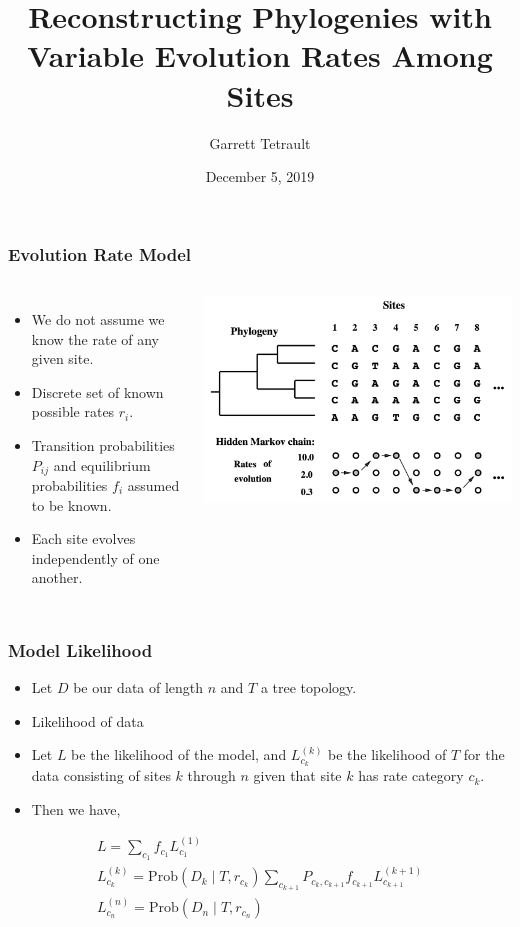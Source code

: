 \documentclass{beamer}
\title{Reconstructing Phylogenies with Variable Evolution Rates Among Sites}
\author{Garrett Tetrault}
\date{December 5, 2019}
\newcommand{\prob}{\mathrm{Prob}}
\begin{document}
\frame{\titlepage}

\begin{frame}
    \frametitle{Evolution Rate Model}
    \begin{columns}
        \begin{itemize}
            \item We do not assume we know the rate of any given site.
            \item Discrete set of known possible rates $r_i$.
            \item Transition probabilities $P_{ij}$ and 
            equilibrium probabilities $f_i$ assumed to be known.
            \item Each site evolves independently of one another.
        \end{itemize}

        \includegraphics[scale=.15]{hmm_model.png}
    \end{columns}
\end{frame}

\begin{frame}
    \frametitle{Model Likelihood}
    \begin{itemize}
        \item Let $D$ be our data of length $n$ and $T$ a tree topology. 

        \item Likelihood of data 

        \item Let $L$ be the likelihood of the model, 
        and $L_{c_k}^{(k)}$ be the likelihood of $T$ for the data consisting of sites $k$ through $n$
        given that site $k$ has rate category $c_k$.

        \item Then we have,
    \end{itemize}
    \begin{gather*}
        L = \sum_{c_1}f_{c_1}L_{c_1}^{(1)} \\
        L_{c_k}^{(k)} = 
            \prob(D_k \mid T, r_{c_k})
            \sum_{c_{k+1}}P_{c_k, c_{k+1}}f_{c_{k+1}}L_{c_{k+1}}^{(k+1)} \\
        L_{c_n}^{(n)} = 
            \prob(D_n \mid T, r_{c_n})
    \end{gather*}
\end{frame}
\end{document}
